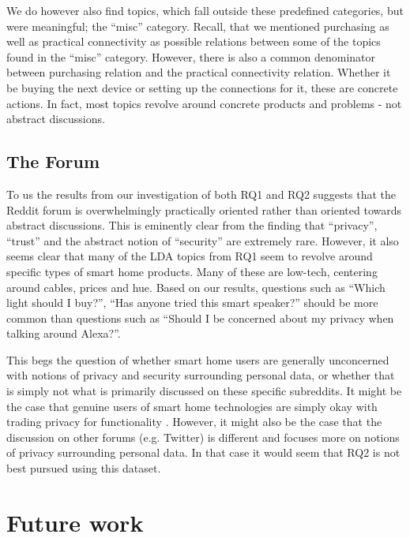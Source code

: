 \documentclass{article}
\begin{document}
We do however also find topics, which fall outside these predefined categories, but were meaningful; the “misc” category. Recall, that we mentioned purchasing as well as practical connectivity as possible relations between some of the topics found in the “misc” category. However, there is also a common denominator between purchasing relation and the practical connectivity relation. Whether it be buying the next device or setting up the connections for it, these are concrete actions. In fact, most topics revolve around concrete products and problems - not abstract discussions. 

    \subsection{The Forum}
    To us the results from our investigation of both RQ1 and RQ2 suggests that the Reddit forum is overwhelmingly practically oriented rather than oriented towards abstract discussions. This is eminently clear from the finding that “privacy”, “trust” and the abstract notion of “security” are extremely rare. However, it also seems clear that many of the LDA topics from RQ1 seem to revolve around specific types of smart home products. Many of these are low-tech, centering around cables, prices and hue. Based on our results, questions such as “Which light should I buy?”, “Has anyone tried this smart speaker?” should be more common than questions such as “Should I be concerned about my privacy when talking around Alexa?”. 

This begs the question of whether smart home users are generally unconcerned with notions of privacy and security surrounding personal data, or whether that is simply not what is primarily discussed on these specific subreddits. It might be the case that genuine users of smart home technologies are simply okay with trading privacy for functionality \cite{hubert2020take, tabassum2019investigating}. However, it might also be the case that the discussion on other forums (e.g. Twitter) is different and focuses more on notions of privacy surrounding personal data. In that case it would seem that RQ2 is not best pursued using this dataset. 

    \section{Future work}
\end{document}
